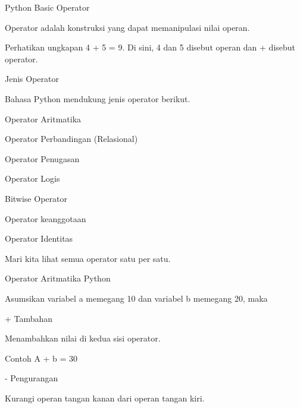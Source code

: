 \sloppy
Python Basic Operator \par
\vspace{12pt}
\noindent 
Operator adalah konstruksi yang dapat memanipulasi nilai operan. \par
\vspace{12pt}
\noindent 
Perhatikan ungkapan 4 + 5 = 9. Di sini, 4 dan 5 disebut operan dan + disebut operator. \par
\vspace{12pt}
\noindent 
Jenis Operator \par
\vspace{12pt}
\noindent 
Bahasa Python mendukung jenis operator berikut. \par
\vspace{12pt}
\noindent 
Operator Aritmatika \par
\vspace{12pt}
\noindent 
Operator Perbandingan (Relasional) \par
\vspace{12pt}
\noindent 
Operator Penugasan \par
\vspace{12pt}
\noindent 
Operator Logis \par
\vspace{12pt}
\noindent 
Bitwise Operator \par
\vspace{12pt}
\noindent 
Operator keanggotaan \par
\vspace{12pt}
\noindent 
Operator Identitas \par
\vspace{12pt}
\noindent 
Mari kita lihat semua operator satu per satu. \par
\vspace{12pt}
\noindent 
Operator Aritmatika Python \par
\vspace{12pt}
\noindent 
Asumsikan variabel a memegang 10 dan variabel b memegang 20, maka  \par
\vspace{12pt}
\noindent 
+ Tambahan \par
\noindent 
Menambahkan nilai di kedua sisi operator. \par
\noindent 
Contoh A + b = 30 \par
\vspace{12pt}
\noindent 
- Pengurangan \par
\noindent 
Kurangi operan tangan kanan dari operan tangan kiri. \par
